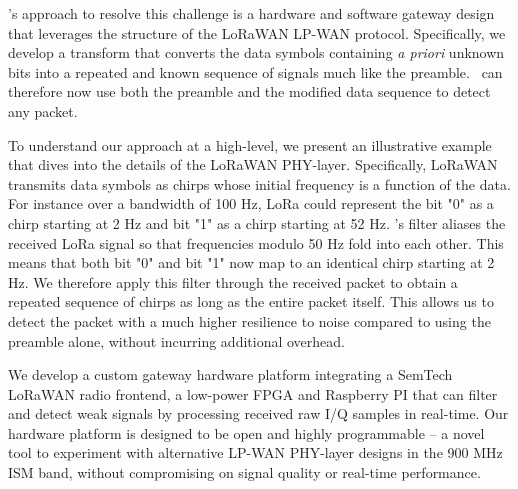\name's approach to resolve this challenge is a hardware and software gateway design that leverages the structure of the LoRaWAN LP-WAN protocol. Specifically, we develop a transform that converts the data symbols containing \textit{a priori} unknown bits into a repeated and known sequence of signals much like the preamble. \name\ can therefore now use both the preamble and the modified data sequence to detect any packet. 


To understand our approach at a high-level, we present an illustrative example that dives into the details of the LoRaWAN PHY-layer. Specifically, LoRaWAN transmits data symbols as chirps whose initial frequency is a function of the data. For instance over a bandwidth of 100 Hz, LoRa could represent the bit "0" as a chirp starting at 2 Hz and bit "1" as a chirp starting at 52 Hz. \name's filter aliases the received LoRa signal so that frequencies modulo 50 Hz fold into each other. This means that both bit "0" and bit "1" now map to an identical chirp starting at 2 Hz. We therefore apply this filter through the received packet to obtain a repeated sequence of chirps as long as the entire packet itself. This allows us to detect the packet with a much higher resilience to noise compared to using the preamble alone, without incurring additional overhead. 

We develop a custom gateway hardware platform integrating a SemTech LoRaWAN radio frontend, a low-power FPGA and Raspberry PI that can filter and detect weak signals by processing received raw I/Q samples in real-time. Our hardware platform is designed to be open and highly programmable -- a novel tool to experiment with alternative LP-WAN PHY-layer designs in the 900 MHz ISM band, without compromising on signal quality or real-time performance. 
 



